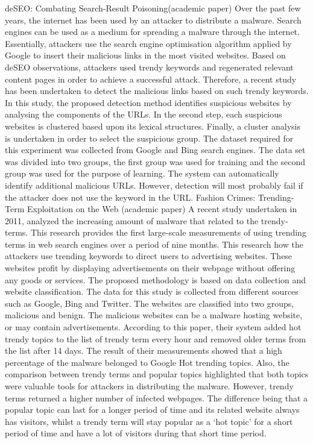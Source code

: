 deSEO: Combating Search-Result Poisoning(academic paper)
Over the past few years, the internet has been used by an attacker to distribute a malware. Search engines can be used as a medium for spreading a malware through the internet. Essentially, attackers use the search engine optimisation algorithm applied by Google to insert their malicious links in the most visited websites. Based on deSEO observations, attackers used trendy keywords and regenerated relevant content pages in order to achieve a successful attack. 
Therefore, a recent study has been undertaken to detect the malicious links based on such trendy keywords. In this study, the proposed detection method identifies suspicious websites by analysing the components of the URLs. In the second step, each suspicious websites is clustered based upon its lexical structures. Finally, a cluster analysis is undertaken in order to select the suspicious group.  
The dataset required for this experiment was collected from Google and Bing search engines. The data set was divided into two groups, the first group was used for training and the second group was used for the purpose of learning. The system can automatically identify additional malicious URLs. However, detection will most probably fail if the attacker does not use the keyword in the URL. 
Fashion Crimes: Trending-Term Exploitation on the Web (academic paper)
A recent study undertaken in 2011, analyzed the increasing amount of malware that related to the trendy-terms. This research provides the first large-scale measurements of using trending terms in web search engines over a period of nine months. This research how the attackers use trending keywords to direct users to advertising websites. These websites profit by displaying advertisements on their webpage without offering any goods or services. 
The proposed methodology is based on data collection and website classification. The data for this study is collected from different sources such as Google, Bing and Twitter. The websites are classified into two groups, malicious and benign. The malicious websites can be a malware hosting website, or may contain advertisements.
According to this paper, their system added hot trendy topics to the list of trendy term every hour and removed older terms from the list after 14 days. The result of their measurements showed that a high percentage of the malware belonged to Google Hot trending topics. Also, the comparison between trendy terms and popular topics highlighted that both topics were valuable tools for attackers in distributing the malware. However, trendy terms returned a higher number of infected webpages. The difference being that a popular topic can last for a longer period of time and its related website always has visitors, whilst a trendy term will stay popular as a ‘hot topic’ for a short period of time and have a lot of visitors during that short time period.

